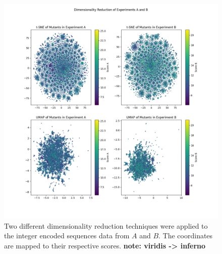 \documentclass[16pt]{book}
\begin{document}
\begin{figure}
	\includegraphics[width=\textwidth]{img/dimred-plt.png}
	\caption{\label{dimredplt} Two different dimensionality reduction techniques were applied to the integer encoded sequences data from $A$ and $B$.
	The coordinates are mapped to their respective scores. \textbf{note: viridis -> inferno}}
\end{figure}
\end{document}
